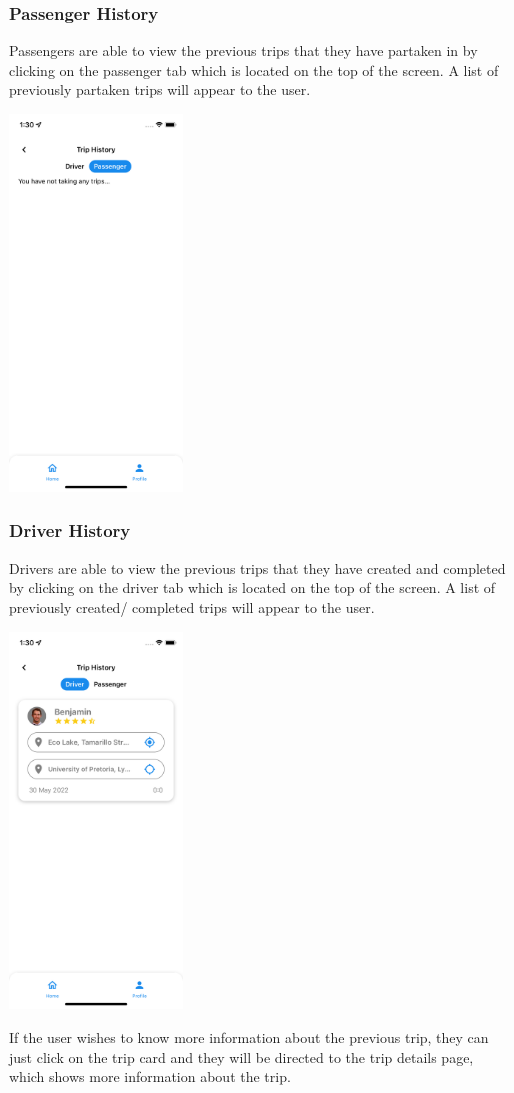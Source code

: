 \documentclass[hidelinks, 12pt, a4paper]{article}
\begin{document}
\subsubsection{Passenger History}
Passengers are able to view the previous trips that they have partaken in by clicking on the passenger tab which is located on the top of the screen. A list of previously partaken trips will appear to the user.
\begin{center}
  \includegraphics[height=10cm]{images/history_passenger.png}
\end{center}
\subsubsection{Driver History}
Drivers are able to view the previous trips that they have created and completed by clicking on the driver tab which is located on the top of the screen. A list of previously created/ completed trips will appear to the user.
\begin{center}
  \includegraphics[height=10cm]{images/history_driver.png}
\end{center}
If the user wishes to know more information about the previous trip, they can just click on the trip card and they will be directed to the trip details page, which shows more information about the trip.
\vspace{1cm}
\end{document}
